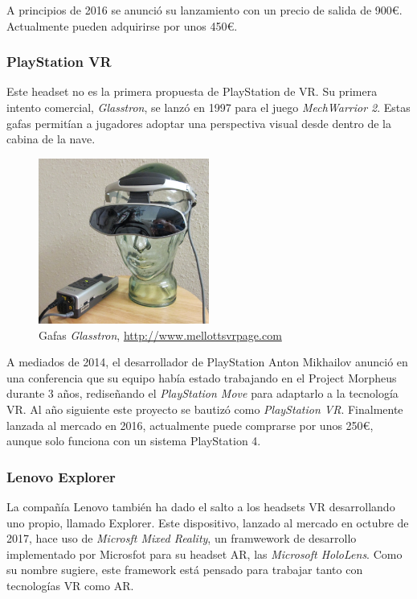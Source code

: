A principios de 2016 se anunció su lanzamiento con un precio de salida de 900\euro. Actualmente pueden adquirirse por unos 450\euro.

\subsubsection{PlayStation VR} 

Este headset no es la primera propuesta de PlayStation de \acs{VR}. Su primera intento comercial, \textit{Glasstron}, se lanzó en 1997 para el juego \textit{MechWarrior 2}. Estas gafas permitían a jugadores adoptar una perspectiva visual desde dentro de la cabina de la nave.
    
\begin{figure}[!h]
\begin{center}
\includegraphics[width=0.5\textwidth]{imagenes/2/glasstron.jpg}
\caption{Gafas \textit{Glasstron}, \url{http://www.mellottsvrpage.com}}
\label{fig:glasstron}
\end{center}
\end{figure}

A mediados de 2014, el desarrollador de PlayStation Anton Mikhailov anunció en una conferencia que su equipo había estado trabajando en el Project Morpheus durante 3 años, rediseñando el \textit{PlayStation Move} para adaptarlo a la tecnología \acs{VR}. Al año siguiente este proyecto se bautizó como \textit{PlayStation VR}. Finalmente lanzada al mercado en 2016, actualmente puede comprarse por unos 250\euro, aunque solo funciona con un sistema PlayStation 4.
    
\subsubsection{Lenovo Explorer} 

La compañía Lenovo también ha dado el salto a los headsets \acs{VR} desarrollando uno propio, llamado Explorer. Este dispositivo, lanzado al mercado en octubre de 2017, hace uso de \textit{Microsft Mixed Reality}, un framwework de desarrollo implementado por Microsfot para su headset \acs{AR}, las \textit{Microsoft HoloLens}. Como su nombre sugiere, este framework está pensado para trabajar tanto con tecnologías \acs{VR} como \acs{AR}.
    
